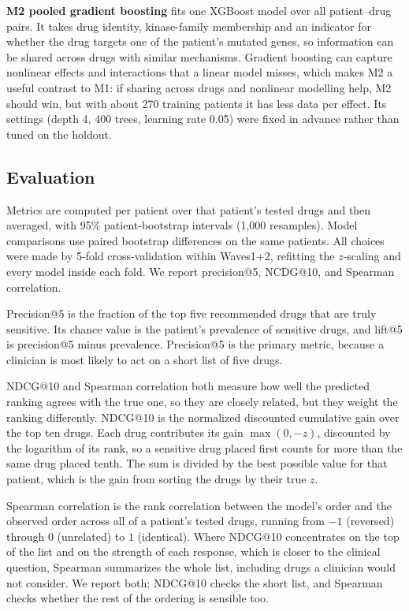 \documentclass[11pt,logo,nonumbering]{preprint}
\newcommand{\z}{z}
\begin{document}
\textbf{M2 pooled gradient boosting} fits one XGBoost model \citep{chen2016xgboost} over all patient--drug pairs. It takes drug identity, kinase-family membership and an indicator for whether the drug targets one of the patient's mutated genes, so information can be shared across drugs with similar mechanisms. Gradient boosting can capture nonlinear effects and interactions that a linear model misses, which makes M2 a useful contrast to M1: if sharing across drugs and nonlinear modelling help, M2 should win, but with about 270 training patients it has less data per effect. Its settings (depth 4, 400 trees, learning rate 0.05) were fixed in advance rather than tuned on the holdout.

\subsection{Evaluation}
Metrics are computed per patient over that patient's tested drugs and then averaged, with 95\% patient-bootstrap intervals (1{,}000 resamples). Model comparisons use paired bootstrap differences on the same patients. All choices were made by 5-fold cross-validation within Waves1+2, refitting the $\z$-scaling and every model inside each fold. We report precision@5, NCDG@10, and Spearman correlation.

Precision@5 is the fraction of the top five recommended drugs that are truly sensitive. Its chance value is the patient's prevalence of sensitive drugs, and lift@5 is precision@5 minus prevalence. Precision@5 is the primary metric, because a clinician is most likely to act on a short list of five drugs.

NDCG@10 and Spearman correlation both measure how well the predicted ranking agrees with the true one, so they are closely related, but they weight the ranking differently. NDCG@10 is the normalized discounted cumulative gain over the top ten drugs. Each drug contributes its gain $\max(0,-\z)$, discounted by the logarithm of its rank, so a sensitive drug placed first counts for more than the same drug placed tenth. The sum is divided by the best possible value for that patient, which is the gain from sorting the drugs by their true $\z$.

Spearman correlation is the rank correlation between the model's order and the observed order across all of a patient's tested drugs, running from $-1$ (reversed) through $0$ (unrelated) to $1$ (identical). Where NDCG@10 concentrates on the top of the list and on the strength of each response, which is closer to the clinical question, Spearman summarizes the whole list, including drugs a clinician would not consider. We report both: NDCG@10 checks the short list, and Spearman checks whether the rest of the ordering is sensible too.
\end{document}
